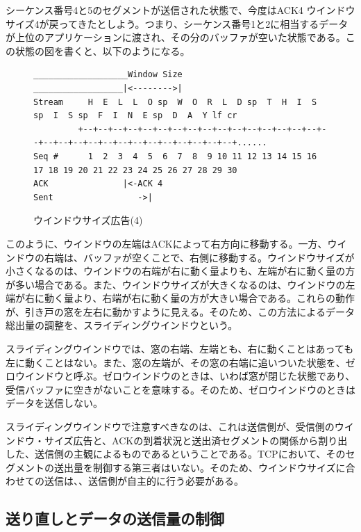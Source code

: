 シーケンス番号4と5のセグメントが送信された状態で、今度はACK4 ウインドウサイズ4が戻ってきたとしよう。つまり、シーケンス番号1と2に相当するデータが上位のアプリケーションに渡され、その分のバッファが空いた状態である。この状態の図を書くと、以下のようになる。

\begin{figure}[h!] \caption{ウインドウサイズ広告(4)} \label{windowsize4}
\begin{center}
{\scriptsize
\begin{verbatim}
___________________Window Size
__________________|<-------->|      
Stream     H  E  L  L  O sp  W  O  R  L  D sp  T  H  I  S sp  I  S sp  F  I  N  E sp  D  A  Y lf cr              
         +--+--+--+--+--+--+--+--+--+--+--+--+--+--+--+--+--+--+--+--+--+--+--+--+--+--+--+--+--+--+......
Seq #      1  2  3  4  5  6  7  8  9 10 11 12 13 14 15 16 17 18 19 20 21 22 23 24 25 26 27 28 29 30
ACK               |<-ACK 4  
Sent                 ->|
\end{verbatim}
}
\end{center}
\end{figure}

このように、ウインドウの左端はACKによって右方向に移動する。一方、ウインドウの右端は、バッファが空くことで、右側に移動する。ウインドウサイズが小さくなるのは、ウインドウの右端が右に動く量よりも、左端が右に動く量の方が多い場合である。また、ウインドウサイズが大きくなるのは、ウインドウの左端が右に動く量より、右端が右に動く量の方が大きい場合である。これらの動作が、引き戸の窓を左右に動かすように見える。そのため、この方法によるデータ総出量の調整を、スライディングウインドウという。

スライディングウインドウでは、窓の右端、左端とも、右に動くことはあっても左に動くことはない。また、窓の左端が、その窓の右端に追いついた状態を、ゼロウインドウと呼ぶ。ゼロウインドウのときは、いわば窓が閉じた状態であり、受信バッファに空きがないことを意味する。そのため、ゼロウインドウのときはデータを送信しない。

スライディングウインドウで注意すべきなのは、これは送信側が、受信側のウインドウ・サイズ広告と、ACKの到着状況と送出済セグメントの関係から割り出した、送信側の主観によるものであるということである。TCPにおいて、そのセグメントの送出量を制御する第三者はいない。そのため、ウインドウサイズに合わせての送信は、、送信側が自主的に行う必要がある。

\subsection{送り直しとデータの送信量の制御}

